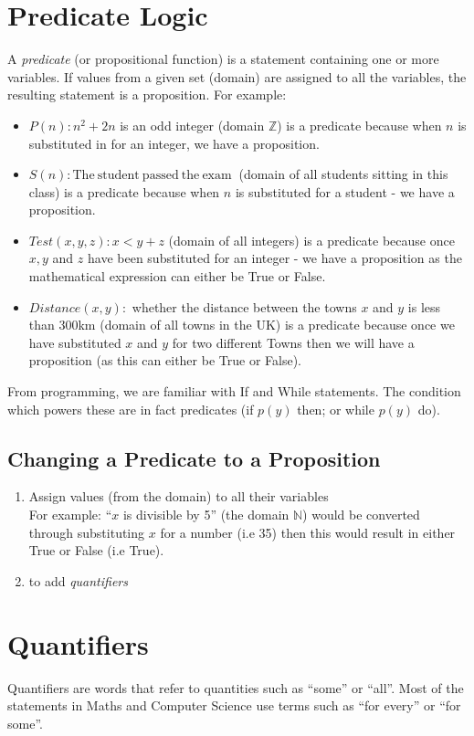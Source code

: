 \section{Predicate Logic}
A \textit{predicate} (or propositional function) is a statement containing one or more variables. If values from a given set (domain) are assigned to all the variables, the resulting statement is a proposition. For example:
\begin{itemize}
    \item $P(n) : n^2 +2n$ is an odd integer (domain $\mathbb{Z}$) is a predicate because when $n$ is substituted in for an integer, we have a proposition.
    \item $S(n) : \mathrm{The\ student\ passed\ the\ exam\ }$ (domain of all students sitting in this class) is a predicate because when $n$ is substituted for a student - we have a proposition.
    \item $Test(x, y, z) : x < y + z$ (domain of all integers) is a predicate because once $x, y$ and $z$ have been substituted for an integer - we have a proposition as the mathematical expression can either be True or False.
    \item $Distance(x,y):$ whether the distance between the towns $x$ and $y$ is less than 300km (domain of all towns in the UK) is a predicate because once we have substituted $x$ and $y$ for two different Towns then we will have a proposition (as this can either be True or False). 
\end{itemize}
From programming, we are familiar with If and While statements. The condition which powers these are  in fact predicates (if $p(y)$ then; or while $p(y)$ do).\\

\subsection{Changing a Predicate to a Proposition}
\begin{enumerate}
    \item Assign values (from the domain) to all their variables\\
    For example: ``$x$ is divisible by 5'' (the domain $\mathbb{N}$) would be converted through substituting $x$ for a number (i.e 35) then this would result in either True or False (i.e True). 
    \item to add \textit{quantifiers}
\end{enumerate}

\section{Quantifiers}
Quantifiers are words that refer to quantities such as ``some'' or ``all''. Most of the statements in Maths and Computer Science use terms such as ``for every'' or ``for some''.\\

